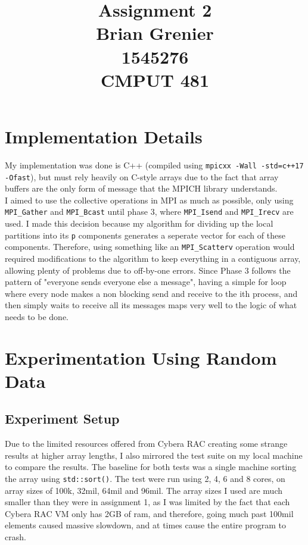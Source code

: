 \documentclass[11pt]{report}
\title{Assignment 2
\\Brian Grenier
\\1545276
\\CMPUT 481}
\begin{document}
\maketitle


\section*{Implementation Details}
My implementation was done is C++ (compiled using \verb|mpicxx -Wall -std=c++17 -Ofast|), but must rely heavily on C-style arrays due to
the fact that array buffers are the only form of message that the MPICH library 
understands.\\
I aimed to use the collective operations in MPI as much as possible, only using \verb|MPI_Gather| and \verb|MPI_Bcast| until phase 3, where \verb|MPI_Isend| and \verb|MPI_Irecv| are used. I made this decision because my algorithm for dividing
up the local partitions into its \verb|p| components generates a seperate vector
for each of these components. Therefore, using something like an \verb|MPI_Scatterv| operation would required modifications to the algorithm to keep everything in a contiguous array, allowing plenty of problems due to off-by-one errors. Since Phase 3 follows the pattern of "everyone sends everyone else a message", having a simple for loop where every node makes a non blocking send and receive to the ith process, and then simply waits to receive all its messages maps very well to the logic of what needs to be done.



\section*{Experimentation Using Random Data}
\subsection*{Experiment Setup}
Due to the limited resources offered from Cybera RAC creating some strange results
at higher array lengths, I also mirrored the test suite on my local machine to
compare the results. The baseline for both tests was a single machine sorting the
array using \verb|std::sort()|. The test were run using 2, 4, 6 and 8 cores, on array sizes of 100k, 32mil, 64mil and 96mil. The array sizes I used are much smaller
than they were in assignment 1, as I was limited by the fact that each Cybera RAC
VM only has 2GB of ram, and therefore, going much past 100mil elements caused 
massive slowdown, and at times cause the entire program to crash.
\end{document}
